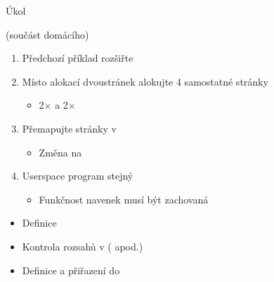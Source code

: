 \begin{frame}{Úkol}

   \iffimuni (součást domácího) \fi
  \begin{enumerate}
    \item Předchozí příklad rozšiřte
    \item Místo alokací dvoustránek alokujte 4 samostatné stránky
    \begin{itemize}
      \item 2$\times$  a 2$\times$ 
    \end{itemize}

    \item Přemapujte stránky v 
    \begin{itemize}
      \item Změna  na 
    \end{itemize}

    \item Userspace program stejný
    \begin{itemize}
      \item Funkčnost navenek musí být zachovaná
    \end{itemize}
  \end{enumerate}

  \medskip

  \begin{itemize}
    \item Definice {\footnotesize{}}
    \item Kontrola rozsahů v  (
      apod.)
    \item Definice  a přiřazení do 
  \end{itemize}

\end{frame}
